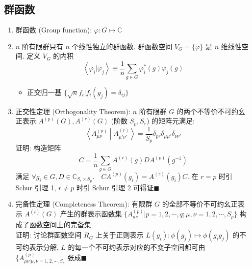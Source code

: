 \documentclass[12pt,a4paper]{article}%
\numberwithin{equation}{section}%
\newcommand\qed{$\blacksquare$}
\begin{document}
\subsection{群函数} %
\label{sub:group_func}
\begin{enumerate}
	\item 群函数 (Group function): $\varphi: G\mapsto \mathbb C$
	\item $n$ 阶有限群只有 $n$ 个线性独立的群函数. 群函数空间 $V_G =\{\varphi\}$ 是 $n$ 维线性空间. 定义 $V_G$ 的内积
	\begin{equation}
		\left\langle \varphi_i|\varphi_j\right\rangle 
		\equiv \frac 1n\sum_{g\in G} \varphi_i^*(g)\varphi_j(g)
	\end{equation}
	\begin{itemize}
		\item 正交归一基 $\{\sqrt n f_i|f_i(g_j) = \delta_{ij}\}$
	\end{itemize}
	\item 正交性定理 (Orthogonality Theorem): $n$ 阶有限群 $G$ 的两个不等价不可约幺正表示 $A^{(p)}(G), A^{(r)}(G)$ (阶数 $S_p, S_r$) 的矩阵元满足:
	\begin{equation}
		\left\langle A^{(p)}_{\mu\nu}\middle|A^{(r)}_{\mu'\nu'}\right\rangle = \frac 1{S_p}\delta_{pr}\delta_{\mu\mu'}\delta_{\nu\nu'}
	\end{equation}
	证明: 构造矩阵
	\begin{equation}
		C = \frac 1n\sum_{g\in G}A^{(r)}(g)DA^{(p)}(g^{-1})
	\end{equation}
	满足 $\forall g_i\in G, D\in \mathbb C_{S_r\times S_p}.\quad CA^{(p)}(g_i) = A^{(r)}(g_i)C$. 在 $r=p$ 时引 Schur 引理 1, $r\neq p$ 时引 Schur 引理 2 可得证\qed
	\item 完备性定理 (Completeness Theorem): 有限群 $G$ 的全部不等价不可约幺正表示 $A^{(i)}(G)$ 产生的群表示函数集 $\{A^{(p)}_{\mu\nu}|p = 1,2,\cdots, q; \mu,\nu = 1,2,\cdots, S_p\}$ 构成了函数空间上的完备集\\
	证明: 讨论群函数空间 $R_G$ 上关于正则表示 $L(g_i): \phi(g_j)\mapsto \phi(g_ig_j)$ 的不可约表示分解, $L$ 的每一个不可约表示对应的不变子空间都可由 $\{A^{(p)}_{\mu\nu|\mu,\nu = 1,2,\cdots, S_p}$ 张成\qed

\end{enumerate}
\end{document}
